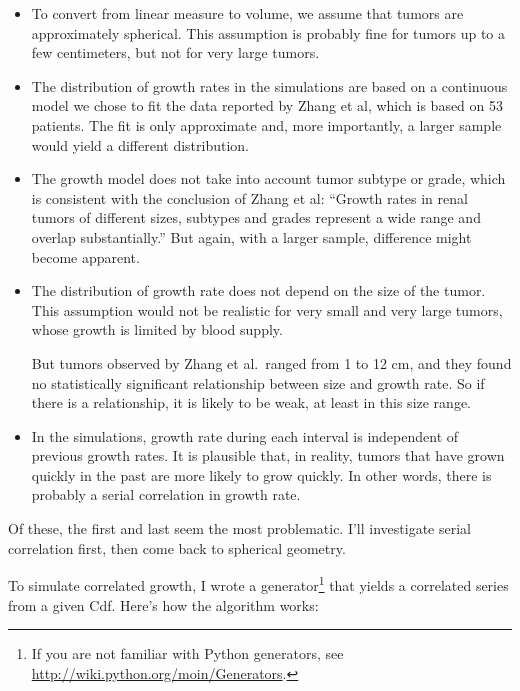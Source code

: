 \documentclass[12pt]{book}
\begin{document}
\begin{itemize}

\item To convert from linear measure to volume, we assume that
  tumors are approximately spherical.  This assumption is probably
  fine for tumors up to a few centimeters, but not for very
  large tumors.

\item The distribution of growth rates in the simulations are based on
  a continuous model we chose to fit the data reported by Zhang et al,
  which is based on 53 patients.  The fit is only approximate and, more
  importantly, a larger sample would yield a
  different distribution.

\item The growth model does not take into account tumor subtype or
  grade, which is consistent with the conclusion of Zhang et al:
  ``Growth rates in renal tumors of different sizes, subtypes and
  grades represent a wide range and overlap substantially.''
  But again, with a larger sample, difference might become apparent.

\item The distribution of growth rate does not depend on the size of
  the tumor.  This assumption would not be realistic for very
  small and very large tumors, whose growth is limited by blood supply.

  But tumors observed by Zhang et al.~ranged from 1 to 12 cm, and they
  found no statistically significant relationship between
  size and growth rate.  So if there is a relationship, it is
  likely to be weak, at least in this size range.
  
\item In the simulations, growth rate during each interval is
  independent of previous growth rates.  It is plausible that, in
  reality, tumors that have grown quickly in the past are more likely
  to grow quickly.  In other words, there is probably
  a serial correlation in growth rate.

\end{itemize}

Of these, the first and last seem the most problematic.  I'll
investigate serial correlation first, then come back to
spherical geometry.

To simulate correlated growth, I wrote a generator\footnote{If you are
  not familiar with Python generators, see
  \url{http://wiki.python.org/moin/Generators}.} that yields a
correlated series from a given Cdf.  Here's how the algorithm works:
\end{document}
